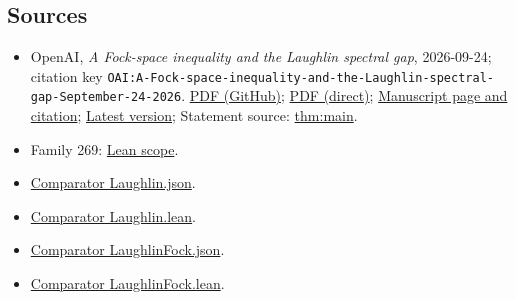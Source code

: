 \documentclass[11pt]{article}
\begin{document}
\subsection{Sources}
\begin{itemize}
\item OpenAI, \emph{A Fock-space inequality and the Laughlin spectral gap}, 2026-09-24; citation key \texttt{OAI:A-Fock-space-inequality-and-the-Laughlin-spectral-gap-September-24-2026}. \href{https://github.com/openai/math/blob/adc7f1241b42e322a6451854ab7e4b4c146bf78a/preprints/A-Fock-space-inequality-and-the-Laughlin-spectral-gap-September-24-2026/A-Fock-space-inequality-and-the-Laughlin-spectral-gap-September-24-2026.pdf}{PDF (GitHub)}; \href{https://github.com/openai/math/raw/adc7f1241b42e322a6451854ab7e4b4c146bf78a/preprints/A-Fock-space-inequality-and-the-Laughlin-spectral-gap-September-24-2026/A-Fock-space-inequality-and-the-Laughlin-spectral-gap-September-24-2026.pdf}{PDF (direct)}; \href{https://github.com/openai/math/blob/adc7f1241b42e322a6451854ab7e4b4c146bf78a/preprints/A-Fock-space-inequality-and-the-Laughlin-spectral-gap-September-24-2026/README.md}{Manuscript page and citation}; \href{https://github.com/openai/math/blob/main/preprints/A-Fock-space-inequality-and-the-Laughlin-spectral-gap-September-24-2026/A-Fock-space-inequality-and-the-Laughlin-spectral-gap-September-24-2026.pdf}{Latest version}; Statement source: \href{https://github.com/openai/math/blob/adc7f1241b42e322a6451854ab7e4b4c146bf78a/preprints/A-Fock-space-inequality-and-the-Laughlin-spectral-gap-September-24-2026/build/sections/01-introduction.tex\#L60}{thm:main}.
\item Family 269: \href{https://github.com/openai/math/blob/adc7f1241b42e322a6451854ab7e4b4c146bf78a/lean/docs/269.md}{Lean scope}.
\item \href{https://github.com/openai/math/blob/adc7f1241b42e322a6451854ab7e4b4c146bf78a/lean/ComparatorChallenges/Laughlin.json}{Comparator Laughlin.json}.
\item \href{https://github.com/openai/math/blob/adc7f1241b42e322a6451854ab7e4b4c146bf78a/lean/ComparatorChallenges/Laughlin.lean}{Comparator Laughlin.lean}.
\item \href{https://github.com/openai/math/blob/adc7f1241b42e322a6451854ab7e4b4c146bf78a/lean/ComparatorChallenges/LaughlinFock.json}{Comparator LaughlinFock.json}.
\item \href{https://github.com/openai/math/blob/adc7f1241b42e322a6451854ab7e4b4c146bf78a/lean/ComparatorChallenges/LaughlinFock.lean}{Comparator LaughlinFock.lean}.

\end{itemize}
\end{document}
